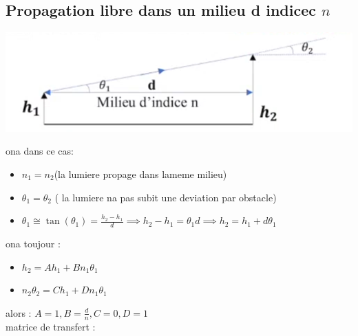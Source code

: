 \documentclass[12pt]{book}
\begin{document}
        \subsection{Propagation libre dans un milieu d indicec $n$}
            \begin{center}
                \includegraphics[width = 0.5\linewidth]{pic/proplibre.png}
            \end{center}
            ona dans ce cas:
            \begin{itemize}
                \item $n_1 = n_2$(la lumiere propage dans lameme milieu)
                \item $\theta_1 = \theta_2$ ( la lumiere na pas subit une deviation par obstacle)
                \item $\theta_1 \cong \tan(\theta_1) = \frac{h_2 - h_1}{d} \implies h_2 - h_1 = \theta_1d \implies h_2 =h_1 + d\theta_1$ 
            \end{itemize}
            ona toujour :
            \begin{itemize}
                \item $ h_2 = Ah_1 + Bn_1\theta_1$
                \item $ n_2\theta_2 = Ch_1 + Dn_1\theta_1$
            \end{itemize}
            alors : $ A = 1 , B = \frac{d}{n} ,C = 0 , D = 1$ \\ 
            matrice de transfert : 
            \begin{center}
                 \\
            \end{center}
\end{document}
